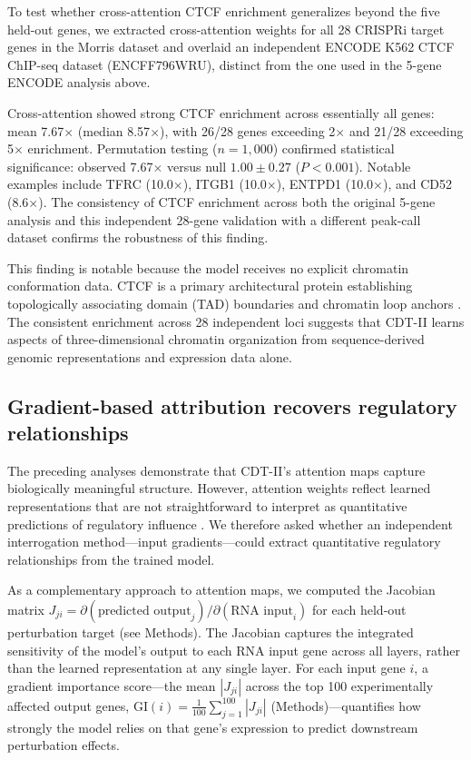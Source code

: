 \documentclass[12pt,a4paper]{article}
\begin{document}
To test whether cross-attention CTCF enrichment generalizes beyond the five held-out genes, we extracted cross-attention weights for all 28 CRISPRi target genes in the Morris dataset \citep{morris2023} and overlaid an independent ENCODE K562 CTCF ChIP-seq dataset (ENCFF796WRU), distinct from the one used in the 5-gene ENCODE analysis above.

Cross-attention showed strong CTCF enrichment across essentially all genes: mean 7.67$\times$ (median 8.57$\times$), with 26/28 genes exceeding 2$\times$ and 21/28 exceeding 5$\times$ enrichment. Permutation testing ($n = 1{,}000$) confirmed statistical significance: observed 7.67$\times$ versus null $1.00 \pm 0.27$ ($P < 0.001$). Notable examples include TFRC (10.0$\times$), ITGB1 (10.0$\times$), ENTPD1 (10.0$\times$), and CD52 (8.6$\times$). The consistency of CTCF enrichment across both the original 5-gene analysis and this independent 28-gene validation with a different peak-call dataset confirms the robustness of this finding.

This finding is notable because the model receives no explicit chromatin conformation data. CTCF is a primary architectural protein establishing topologically associating domain (TAD) boundaries and chromatin loop anchors \citep{dixon2012}. The consistent enrichment across 28 independent loci suggests that CDT-II learns aspects of three-dimensional chromatin organization from sequence-derived genomic representations and expression data alone.

\subsection{Gradient-based attribution recovers regulatory relationships}

The preceding analyses demonstrate that CDT-II's attention maps capture biologically meaningful structure. However, attention weights reflect learned representations that are not straightforward to interpret as quantitative predictions of regulatory influence \citep{jain2019,wiegreffe2019}. We therefore asked whether an independent interrogation method---input gradients---could extract quantitative regulatory relationships from the trained model.

As a complementary approach to attention maps, we computed the Jacobian matrix $J_{ji} = \partial(\text{predicted output}_j)/\partial(\text{RNA input}_i)$ for each held-out perturbation target (see Methods). The Jacobian captures the integrated sensitivity of the model's output to each RNA input gene across all layers, rather than the learned representation at any single layer. For each input gene $i$, a gradient importance score---the mean $|J_{ji}|$ across the top 100 experimentally affected output genes, $\text{GI}(i) = \frac{1}{100}\sum_{j=1}^{100} |J_{ji}|$ (Methods)---quantifies how strongly the model relies on that gene's expression to predict downstream perturbation effects.
\end{document}
